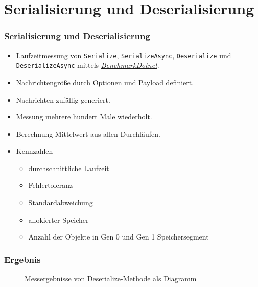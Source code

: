 \documentclass[11pt,t,usepdftitle=false,aspectratio=169,usenames,dvipsnames]{beamer}
\begin{document}
    \section{Serialisierung und Deserialisierung}
    \begin{frame}
        \frametitle{Serialisierung und Deserialisierung}
        
        \begin{itemize}
            \item<1-> Laufzeitmessung von \texttt{Serialize}, \texttt{SerializeAsync}, \texttt{Deserialize} und \texttt{DeserializeAsync} mittels \textit{\href{https://github.com/dotnet/BenchmarkDotNet}{BenchmarkDotnet}}.
            \item<2-> Nachrichtengröße durch Optionen und Payload definiert.
            \item<3-> Nachrichten zufällig generiert.
            \item<4-> Messung mehrere hundert Male wiederholt.
            \item<5-> Berechnung Mittelwert aus allen Durchläufen.
            \item<6-> Kennzahlen
            \begin{itemize}
                \item<7-> durchschnittliche Laufzeit
                \item<8-> Fehlertoleranz
                \item<9-> Standardabweichung
                \item<10-> allokierter Speicher
                \item<11-> Anzahl der Objekte in Gen 0 und Gen 1 Speichersegment
            \end{itemize}
        \end{itemize}
    \end{frame}
    \begin{frame}
        \frametitle{Ergebnis}
        
        \begin{figure}[h]
            \centering
            \caption{Messergebnisse von Deserialize-Methode als Diagramm}
            \label{fig:messergebnisse-deserialize}
        \end{figure}
    \end{frame}
\end{document}
